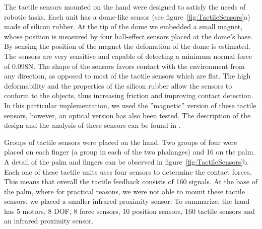 %
The tactile sensors mounted on the hand were designed to satisfy the
needs of robotic tasks. Each unit has a dome-like sensor (see
figure~\ref{fig:TactileSensors}a) made of silicon rubber. At the
tip of the dome we embedded a small magnet, whose position is
measured by four hall-effect sensors placed at the dome's base. By
sensing the position of the magnet the defomation of the dome
is estimated. The sensors are very sensitive and capable of 
detecting a minimum normal force of 0.098N. The shape of the sensors 
favors contact with the environment from any direction, as 
opposed to most of the tactile sensors which are
flat. The high deformability and the properties of the silicon
rubber allow the sensors to conform to the objects, thus
increasing friction and improving contact detection. In this
particular implementation, we used the ''magnetic'' version of
these tactile sensors, however, an optical version has also been
tested. The description of the design and the analysis of these
sensors can be found in \cite{etorresjSoft}.

Groups of tactile sensors were placed on the hand. Two groups of
four were placed on each finger (a group in each of the two
phalanges) and 16 on the palm. A detail of the palm and fingers
can be observed in figure~\ref{fig:TactileSensors}b. Each one of
these tactile units uses four sensors to determine the contact
forces. This means that overall the tactile feedback consists of
160 signals. At the base of the palm, where for practical reasons,
we were not able to mount these tactile sensors, we placed a
smaller infrared proximity sensor. To summarize, the hand has 5
motors, 8 DOF, 8 force sensors, 10 position sensors, 160 tactile
sensors and an infrared proximity sensor.


